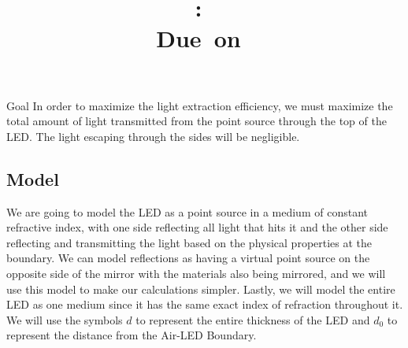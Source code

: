 \documentclass[12pt]{article}
\title{
    \vspace{2in}
    \textmd{\textbf{\hmwkClass:\ \hmwkTitle}}\\
    \normalsize\vspace{0.1in}\small{Due\ on\ \hmwkDueDate}\\
    \vspace{0.1in}\large{\textit{\hmwkClassInstructor}}
    \vspace{3in}
}
\author{\hmwkAuthorName}
\date{}
\newcommand{\enterProblemHeader}[1]{
	\rhead{#1}
}
\newenvironment{main_section}[1]{
	\section{#1}
	\enterProblemHeader{#1}
}{
	\pagebreak
}
\begin{document}
\maketitle

\pagebreak

\begin{main_section}{Goal}
	In order to maximize the light extraction efficiency, we must maximize the
	total amount of light transmitted from the point source through the top of
	the LED. The light escaping through the sides will be negligible.

	\subsection{Model}

	We are going to model the LED as a point source in a medium of constant
	refractive index, with one side reflecting all light that hits it and the
	other side reflecting and transmitting the light based on the physical
	properties at the boundary. We can model reflections as having a virtual
	point source on the opposite side of the mirror with the materials also
	being mirrored, and we will use this model to make our calculations simpler.
	Lastly, we will model the entire LED as one medium since it has the same
	exact index of refraction throughout it. We will use the symbols $d$ to
	represent the entire thickness of the LED and $d_0$ to represent the
	distance from the Air-LED Boundary.



\end{main_section}
\end{document}
